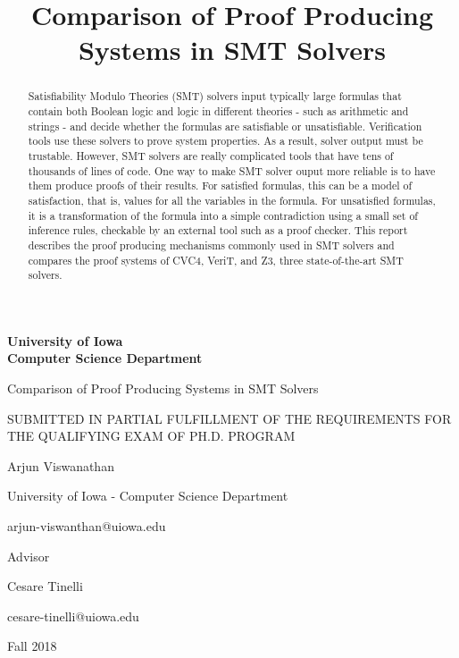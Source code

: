 \documentclass{article}
\begin{document}
\begin{titlepage}
	\centering
	{\textbf{\Large University of Iowa \\ Computer Science Department}}
	\vspace{1cm}
	
	{\Huge Comparison of Proof Producing Systems in SMT Solvers \par}
	\vspace{1cm}
	
	{\large SUBMITTED IN PARTIAL FULFILLMENT OF THE REQUIREMENTS 
		FOR THE QUALIFYING EXAM OF PH.D. PROGRAM \par}
	\vspace{2cm}
	
	{\Large Arjun Viswanathan \par}
	{\large University of Iowa - Computer Science Department \par}
	{\large arjun-viswanthan@uiowa.edu}
	\vspace{2cm}
	
	{\large Advisor \par}
	{\Large Cesare Tinelli \par}
	{\large cesare-tinelli@uiowa.edu \par}
	
	\vfill
	{\large Fall 2018}
\end{titlepage}

\title{Comparison of Proof Producing Systems in SMT Solvers}
\date{}
\maketitle
\begin{abstract}
Satisfiability Modulo Theories (SMT) solvers input typically
large formulas that contain both Boolean logic and logic in 
different theories - such as arithmetic and strings - and 
decide whether 
the formulas are satisfiable or unsatisfiable. Verification 
tools use these solvers to prove system properties. As a 
result, solver output must be trustable. However, SMT solvers 
are really complicated tools that have tens of thousands of 
lines of code. One way to make SMT solver ouput more reliable is 
to have them produce proofs of their results. 
For satisfied formulas, this can be a model of 
satisfaction, that is, values for all the variables in the
formula. For unsatisfied formulas, it is a transformation of 
the formula into a simple contradiction using a small set of 
inference rules, checkable by an external tool such as a proof 
checker. This report describes the proof producing mechanisms 
commonly used in SMT solvers and compares the proof systems 
of CVC4, VeriT, and Z3, three state-of-the-art SMT solvers.
\end{abstract}
\end{document}
